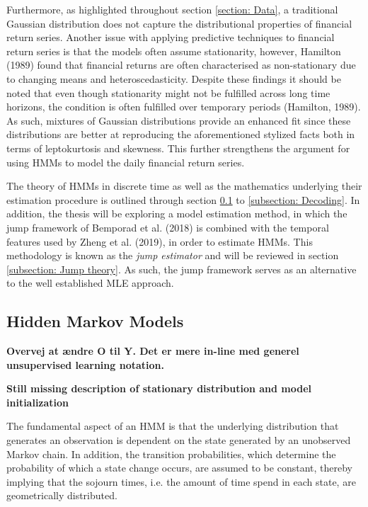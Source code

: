 Furthermore, as highlighted throughout section \ref{section: Data}, a traditional Gaussian distribution does not capture the distributional properties of financial return series. Another issue with applying predictive techniques to financial return series is that the models often assume stationarity, however, Hamilton (1989) found that financial returns are often characterised as non-stationary due to changing means and heteroscedasticity. Despite these findings it should be noted that even though stationarity might not be fulfilled across long time horizons, the condition is often fulfilled over temporary periods (Hamilton, 1989). As such, mixtures of Gaussian distributions provide an enhanced fit since these distributions are better at reproducing the aforementioned stylized facts both in terms of leptokurtosis and skewness. This further strengthens the argument for using HMMs to model the daily financial return series. 

The theory of HMMs in discrete time as well as the mathematics underlying their estimation procedure is outlined through section \ref{subsection: HMM} to \ref{subsection: Decoding}. In addition, the thesis will be exploring a model estimation method, in which the jump framework of Bemporad et al. (2018) is combined with the temporal features used by Zheng et al. (2019), in order to estimate HMMs. This methodology is known as the \textit{jump estimator} and will be reviewed in section \ref{subsection: Jump theory}. As such, the jump framework serves as an alternative to the well established MLE approach. 


\subsection{Hidden Markov Models}
\label{subsection: HMM}

\textbf{Overvej at ændre O til Y. Det er mere in-line med generel unsupervised learning notation.}

\textbf{Still missing description of stationary distribution and model initialization}

The fundamental aspect of an HMM is that the underlying distribution that generates an observation is dependent on the state generated by an unobserved Markov chain. In addition, the transition probabilities, which determine the probability of which a state change occurs, are assumed to be constant, thereby implying that the sojourn times, i.e. the amount of time spend in each state, are geometrically distributed.

